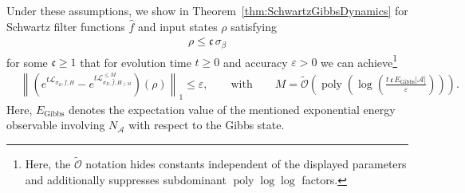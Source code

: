\documentclass[11pt]{amsart}
\newcommand{\1}{\mathbbm{1}}
\newcommand{\cL}{\mathcal{L}}
\newcommand{\eps}{\varepsilon}
\newcommand{\NA}{N_{\mathcal{A}}}
\newcommand{\cA}{\mathcal{A}}
\theoremstyle{plain}
\theoremstyle{definition}
\theoremstyle{remark}
\numberwithin{equation}{section}
\begin{document}
Under these assumptions, we show in Theorem~\ref{thm:SchwartzGibbsDynamics} for Schwartz filter functions $\widehat{f}$ and input states $\rho$ satisfying
\begin{align}
\label{eq:rhocIntro}
    \rho \le \mathfrak{c} \,\sigma_\beta
\end{align}
for some $\mathfrak{c}\ge 1$ that for evolution time $t\ge 0$ and accuracy $\eps>0$ we can achieve\footnote{Here, the $\widetilde{\mathcal{O}}$ notation hides constants independent of the displayed parameters and additionally suppresses subdominant $\operatorname{poly}\log\log$ factors.}  \begin{align}\label{eq:MetalIntro}
       &\left\|\left(e^{t\cL_{\sigma_E,\widehat f,H}}-e^{t\cL^{\le M}_{\sigma_E,\widehat f,H_{\le M}}}\right)(\rho)\right\|_1\le \eps,\qquad\text{with}\qquad M = \widetilde{\mathcal{O}} \left(\operatorname{poly}\left(\log\left(\frac{t\,\mathfrak{c}\,E_{\operatorname{Gibbs}}|\cA|}{ \eps}\right)\right)\right).
    \end{align}
Here, $E_{\operatorname{Gibbs}}$ denotes the expectation value of the mentioned exponential energy observable involving $\NA$ with respect to the Gibbs state.
\end{document}

